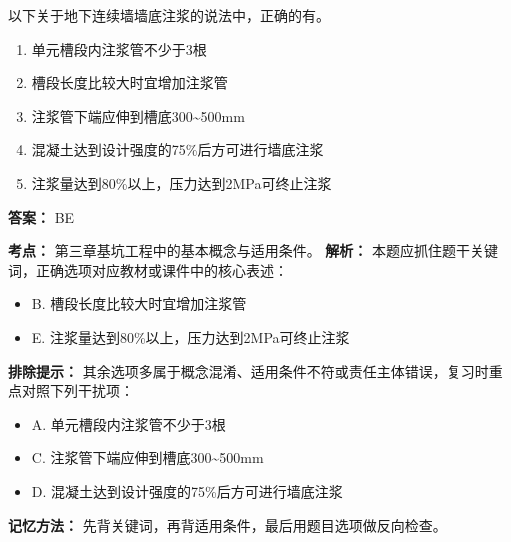 \documentclass[UTF8,fontset=fandol,11pt]{ctexart}
\begin{document}
\begin{quizbox}[title={第 7 题}]
以下关于地下连续墙墙底注浆的说法中，正确的有。\\
\begin{enumerate}[label=\Alph*.]
\item 单元槽段内注浆管不少于3根
\item 槽段长度比较大时宜增加注浆管
\item 注浆管下端应伸到槽底300\textasciitilde{}500mm
\item 混凝土达到设计强度的75\%后方可进行墙底注浆
\item 注浆量达到80\%以上，压力达到2MPa可终止注浆
\end{enumerate}
\textbf{答案：} BE
\vspace{0.25em}
\begin{answerbox}[title={考点解析}]
\textbf{考点：} 第三章基坑工程中的基本概念与适用条件。
\textbf{解析：} 本题应抓住题干关键词，正确选项对应教材或课件中的核心表述：
\begin{itemize}
\item B. 槽段长度比较大时宜增加注浆管
\item E. 注浆量达到80\%以上，压力达到2MPa可终止注浆
\end{itemize}
\textbf{排除提示：} 其余选项多属于概念混淆、适用条件不符或责任主体错误，复习时重点对照下列干扰项：
\begin{itemize}
\item A. 单元槽段内注浆管不少于3根
\item C. 注浆管下端应伸到槽底300\textasciitilde{}500mm
\item D. 混凝土达到设计强度的75\%后方可进行墙底注浆
\end{itemize}
\textbf{记忆方法：} 先背关键词，再背适用条件，最后用题目选项做反向检查。
\end{answerbox}
\end{quizbox}
\end{document}
